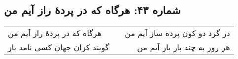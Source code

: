 \begin{center}
\section*{شماره ۴۳: هرگاه که در پردۀ راز آیم من}
\label{sec:043}
\begin{longtable}{l p{0.5cm} r}
هرگاه که در پردهٔ راز آیم من
&&
در گرد دو کون پرده ساز آیم من
\\
گویند کزان جهان کسی نامد باز
&&
هر روز به چند بار باز آیم من
\\
\end{longtable}
\end{center}
